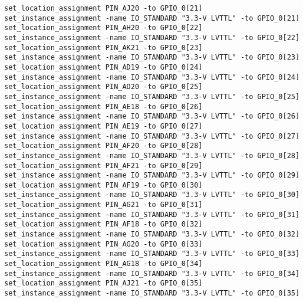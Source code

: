 \begin{verbatim}
set_location_assignment PIN_AJ20 -to GPIO_0[21]
set_instance_assignment -name IO_STANDARD "3.3-V LVTTL" -to GPIO_0[21]
set_location_assignment PIN_AH20 -to GPIO_0[22]
set_instance_assignment -name IO_STANDARD "3.3-V LVTTL" -to GPIO_0[22]
set_location_assignment PIN_AK21 -to GPIO_0[23]
set_instance_assignment -name IO_STANDARD "3.3-V LVTTL" -to GPIO_0[23]
set_location_assignment PIN_AD19 -to GPIO_0[24]
set_instance_assignment -name IO_STANDARD "3.3-V LVTTL" -to GPIO_0[24]
set_location_assignment PIN_AD20 -to GPIO_0[25]
set_instance_assignment -name IO_STANDARD "3.3-V LVTTL" -to GPIO_0[25]
set_location_assignment PIN_AE18 -to GPIO_0[26]
set_instance_assignment -name IO_STANDARD "3.3-V LVTTL" -to GPIO_0[26]
set_location_assignment PIN_AE19 -to GPIO_0[27]
set_instance_assignment -name IO_STANDARD "3.3-V LVTTL" -to GPIO_0[27]
set_location_assignment PIN_AF20 -to GPIO_0[28]
set_instance_assignment -name IO_STANDARD "3.3-V LVTTL" -to GPIO_0[28]
set_location_assignment PIN_AF21 -to GPIO_0[29]
set_instance_assignment -name IO_STANDARD "3.3-V LVTTL" -to GPIO_0[29]
set_location_assignment PIN_AF19 -to GPIO_0[30]
set_instance_assignment -name IO_STANDARD "3.3-V LVTTL" -to GPIO_0[30]
set_location_assignment PIN_AG21 -to GPIO_0[31]
set_instance_assignment -name IO_STANDARD "3.3-V LVTTL" -to GPIO_0[31]
set_location_assignment PIN_AF18 -to GPIO_0[32]
set_instance_assignment -name IO_STANDARD "3.3-V LVTTL" -to GPIO_0[32]
set_location_assignment PIN_AG20 -to GPIO_0[33]
set_instance_assignment -name IO_STANDARD "3.3-V LVTTL" -to GPIO_0[33]
set_location_assignment PIN_AG18 -to GPIO_0[34]
set_instance_assignment -name IO_STANDARD "3.3-V LVTTL" -to GPIO_0[34]
set_location_assignment PIN_AJ21 -to GPIO_0[35]
set_instance_assignment -name IO_STANDARD "3.3-V LVTTL" -to GPIO_0[35]


\end{verbatim}
